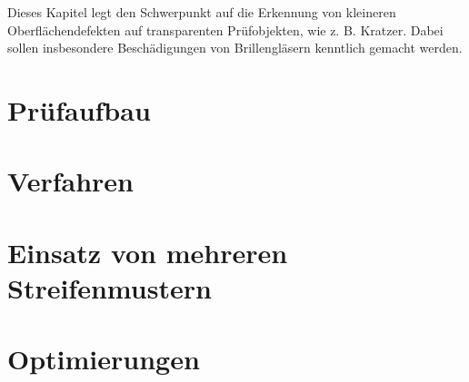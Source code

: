 Dieses Kapitel legt den Schwerpunkt auf die Erkennung von kleineren Oberflächendefekten auf transparenten Prüfobjekten, wie z. B. Kratzer.
Dabei sollen insbesondere Beschädi\-gungen von Brillengläsern kenntlich gemacht werden.

{
	\FloatBarrier
    \section{Prüfaufbau}
    \label{sec:pruefaufbau}
    
}

{
	\FloatBarrier
    \section{Verfahren}
    \label{sec:verfahren}
    
}

{
	\FloatBarrier
    \section{Einsatz von mehreren Streifenmustern}
    \label{sec:einsatzVonMehrerenStreifenmustern}
    
}

{
	\FloatBarrier
    \section{Optimierungen}
    \label{sec:optimierungen}
    
}